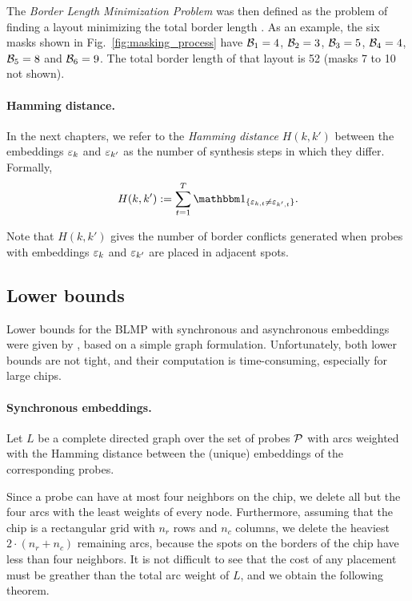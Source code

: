 The \emph{Border Length Minimization Problem} was then defined as the problem of
finding a layout minimizing the total border length \citep{Hannenhalli2002}. As
an example, the six masks shown in Fig.~\ref{fig:masking_process} have
${\mathcal{B}}_1 = 4$, ${\mathcal{B}}_2 = 3$, ${\mathcal{B}}_3 = 5$, ${\mathcal{B}}_4 = 4$, ${\mathcal{B}}_5 = 8$ and
${\mathcal{B}}_6 = 9$. The total border length of that layout is 52 (masks 7 to 10 not
shown).

\paragraph{Hamming distance.}
In the next chapters, we refer to the \emph{Hamming distance} $H(k,k')$ between
the embeddings $\varepsilon_k$ and $\varepsilon_{k'}$ as the number of synthesis steps in
which they differ. Formally,
\begin{equation}\label{eq:hamming}
  H(k,k') := \sum_{t=1}^{T} \Ind{\eps_{k,t} \neq \eps_{k',t}}.
\end{equation}

Note that $H(k,k')$ gives the number of border conflicts generated when probes
with embeddings $\varepsilon_k$ and $\varepsilon_{k'}$ are placed in adjacent spots.

\subsection{Lower bounds}

Lower bounds for the BLMP with synchronous and asynchronous embeddings were
given by \citet{Kahng2002}, based on a simple graph formulation. Unfortunately,
both lower bounds are not tight, and their computation is time-consuming,
especially for large chips.

\paragraph{Synchronous embeddings.}
Let $L$ be a complete directed graph over the set of probes ${\mathcal{P}}$ with arcs
weighted with the Hamming distance between the (unique) embeddings of the
corresponding probes.

Since a probe can have at most four neighbors on the chip, we delete all but the
four arcs with the least weights of every node. Furthermore, assuming that the
chip is a rectangular grid with $n_r$ rows and $n_c$ columns, we delete the
heaviest $2 \cdot (n_r + n_c)$ remaining arcs, because the spots on the borders
of the chip have less than four neighbors. It is not difficult to see that the
cost of any placement must be greather than the total arc weight of $L$, and we
obtain the following theorem.

